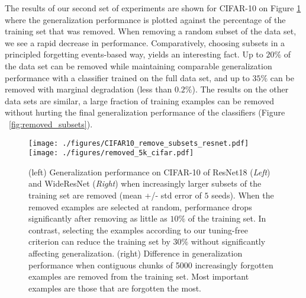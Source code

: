 The results of our second set of experiments are shown for CIFAR-10 on Figure \ref{fig:remove_subsets_cifar} where the generalization performance is plotted against the percentage of the training set that was removed. When removing a random subset of the data set, we see a rapid decrease in performance. Comparatively, choosing subsets in a principled forgetting events-based way, yields an interesting fact. Up to $20\%$ of the data set can be removed while maintaining comparable generalization performance with a classifier trained on the full data set, and up to $35\%$ can be removed with marginal degradation (less than $0.2\%$). The results on the other data sets are similar, a large fraction of training examples can be removed without hurting the final generalization performance of the classifiers (Figure ~\ref{fig:removed_subsets}).

\begin{figure}[h]
    \begin{center}
    \texttt{[image: ./figures/CIFAR10\_remove\_subsets\_resnet.pdf]}
    \texttt{[image: ./figures/removed\_5k\_cifar.pdf]}
    \end{center}
    \caption{(left) Generalization performance on CIFAR-10 of ResNet18 (\textit{Left}) and WideResNet (\textit{Right}) when increasingly larger subsets of the training set are removed (mean +/- std error of $5$ seeds). When the removed examples are selected at random, performance drops significantly after removing as little as $10\%$ of the training set. In contrast, selecting the examples according to our tuning-free criterion can reduce the training set by $30\%$ without significantly affecting generalization. (right) Difference in generalization performance when contiguous chunks of 5000 increasingly forgotten examples are removed from the training set. Most important examples are those that are forgotten the most.}
    \label{fig:remove_subsets_cifar}
\end{figure}


